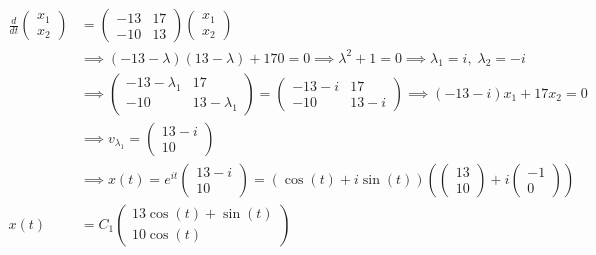 \documentclass[12pt]{article}
\begin{document}
\begin{enumerate}
    \color{blue}
        \begin{align*}
            \frac{d}{dt} \begin{pmatrix}
                x_1\\ x_2
            \end{pmatrix} &= \begin{pmatrix}
                -13 & 17\\ 
                -10 & 13
            \end{pmatrix} \begin{pmatrix}
                x_1\\ x_2
            \end{pmatrix}\\
            &\implies (-13 - \lambda)(13 - \lambda) + 170 = 0 \implies \lambda^2 + 1 =0 \implies \lambda_1 = i, \; \lambda_2 = -i\\ 
            &\implies \begin{pmatrix}
                -13 - \lambda_1 & 17\\ 
                -10 & 13 - \lambda_1
            \end{pmatrix} = \begin{pmatrix}
                -13 - i & 17\\ 
                -10 & 13 - i
            \end{pmatrix} \implies (-13 - i)x_1 + 17x_2 = 0 \\ 
            &\implies v_{\lambda_1} = \begin{pmatrix}
                13 - i\\ 
                10
            \end{pmatrix}\\
            &\implies x(t) = e^{it}\begin{pmatrix}
                13-i\\ 10
            \end{pmatrix} = (\cos(t) + i\sin(t))\left(\begin{pmatrix}
                13\\10
            \end{pmatrix} + i\begin{pmatrix}
                -1\\0
            \end{pmatrix}\right)\\ 
            x(t) &= C_1\begin{pmatrix}
                13\cos(t) + \sin(t)\\ 10\cos(t)

\end{pmatrix}
\end{align*}
\end{enumerate}
\end{document}
